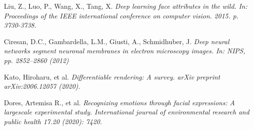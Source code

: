\documentclass[12pt,a4]{article}
\begin{document}
\begin{thebibliography}{9}
    Liu, Z., Luo, P., Wang, X., Tang, X.
    \textit{Deep learning face attributes in the wild. In: Proceedings of the IEEE international conference on computer vision. 2015. p. 3730-3738.}

    Ciresan, D.C., Gambardella, L.M., Giusti, A., Schmidhuber, J.
    \textit{Deep neural networks segment neuronal membranes in electron microscopy images. In: NIPS, pp. 2852–2860 (2012)}

    Kato, Hiroharu, et al.
    \textit{Differentiable rendering: A survey. arXiv preprint arXiv:2006.12057 (2020).}

    Dores, Artemisa R., et al.
    \textit{Recognizing emotions through facial expressions: A largescale experimental study. International journal of environmental research and public health 17.20 (2020): 7420.}

	\end{thebibliography}
\end{document}
